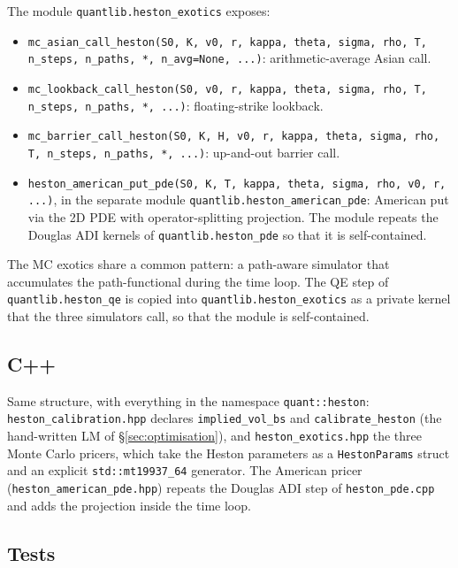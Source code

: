 \documentclass[11pt]{article}
\theoremstyle{plain}
\theoremstyle{definition}
\theoremstyle{remark}
\begin{document}
The module \texttt{quantlib.heston\_exotics} exposes:
\begin{itemize}[topsep=2pt]
    \item \texttt{mc\_asian\_call\_heston(S0, K, v0, r, kappa, theta, sigma, rho, T, n\_steps, n\_paths, *, n\_avg=None, ...)}: arithmetic-average Asian call.
    \item \texttt{mc\_lookback\_call\_heston(S0, v0, r, kappa, theta, sigma, rho, T, n\_steps, n\_paths, *, ...)}: floating-strike lookback.
    \item \texttt{mc\_barrier\_call\_heston(S0, K, H, v0, r, kappa, theta, sigma, rho, T, n\_steps, n\_paths, *, ...)}: up-and-out barrier call.
    \item \texttt{heston\_american\_put\_pde(S0, K, T, kappa, theta, sigma, rho, v0, r, ...)}, in the separate module \texttt{quantlib.heston\_american\_pde}: American put via the 2D PDE with operator-splitting projection. The module repeats the Douglas ADI kernels of \texttt{quantlib.heston\_pde} so that it is self-contained.
\end{itemize}
The MC exotics share a common pattern: a path-aware simulator that accumulates the path-functional during the time loop. The QE step of \texttt{quantlib.heston\_qe} is copied into \texttt{quantlib.heston\_exotics} as a private kernel that the three simulators call, so that the module is self-contained.

\subsection{C++}

Same structure, with everything in the namespace \texttt{quant::heston}: \texttt{heston\_calibration.hpp} declares \texttt{implied\_vol\_bs} and \texttt{calibrate\_heston} (the hand-written LM of \S\ref{sec:optimisation}), and \texttt{heston\_exotics.hpp} the three Monte Carlo pricers, which take the Heston parameters as a \texttt{HestonParams} struct and an explicit \texttt{std::mt19937\_64} generator. The American pricer (\texttt{heston\_american\_pde.hpp}) repeats the Douglas ADI step of \texttt{heston\_pde.cpp} and adds the projection inside the time loop.

\subsection{Tests}
\end{document}
